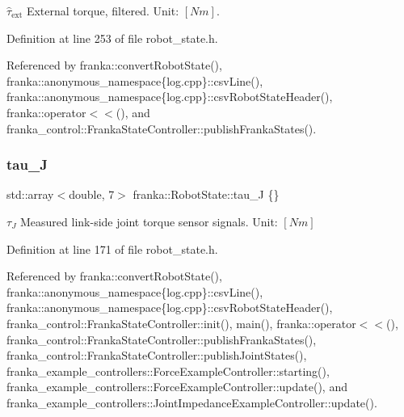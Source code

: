 $\hat{\tau}_{\text{ext}}$ External torque, filtered. Unit\+: $[Nm]$. 

Definition at line 253 of file robot\+\_\+state.\+h.



Referenced by franka\+::convert\+Robot\+State(), franka\+::anonymous\+\_\+namespace\{log.\+cpp\}\+::csv\+Line(), franka\+::anonymous\+\_\+namespace\{log.\+cpp\}\+::csv\+Robot\+State\+Header(), franka\+::operator$<$$<$(), and franka\+\_\+control\+::\+Franka\+State\+Controller\+::publish\+Franka\+States().

\mbox{\label{structfranka_1_1RobotState_ad90e2518d661da0d8fa4c864bae210e5}} 
\subsubsection{\texorpdfstring{tau\+\_\+J}{tau\_J}}
{\footnotesize\ttfamily std\+::array$<$double, 7$>$ franka\+::\+Robot\+State\+::tau\+\_\+J \{\}}

$\tau_{J}$ Measured link-\/side joint torque sensor signals. Unit\+: $[Nm]$ 

Definition at line 171 of file robot\+\_\+state.\+h.



Referenced by franka\+::convert\+Robot\+State(), franka\+::anonymous\+\_\+namespace\{log.\+cpp\}\+::csv\+Line(), franka\+::anonymous\+\_\+namespace\{log.\+cpp\}\+::csv\+Robot\+State\+Header(), franka\+\_\+control\+::\+Franka\+State\+Controller\+::init(), main(), franka\+::operator$<$$<$(), franka\+\_\+control\+::\+Franka\+State\+Controller\+::publish\+Franka\+States(), franka\+\_\+control\+::\+Franka\+State\+Controller\+::publish\+Joint\+States(), franka\+\_\+example\+\_\+controllers\+::\+Force\+Example\+Controller\+::starting(), franka\+\_\+example\+\_\+controllers\+::\+Force\+Example\+Controller\+::update(), and franka\+\_\+example\+\_\+controllers\+::\+Joint\+Impedance\+Example\+Controller\+::update().

\mbox{\label{structfranka_1_1RobotState_a7086a89a2705810f93a3a95d43df2d9d}} 
